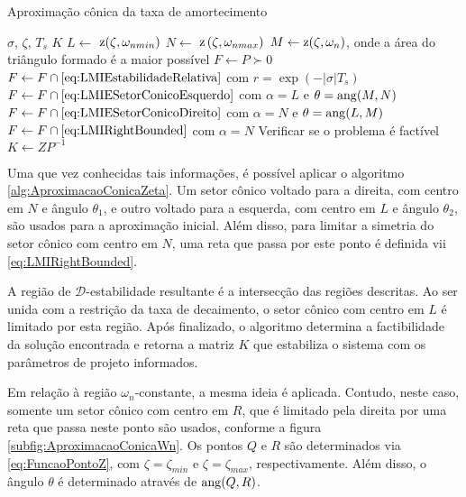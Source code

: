 \begin{algorithm}[ht!]
  \caption{Aproximação cônica da taxa de amortecimento}\label{alg:AproximacaoConicaZeta}
  \begin{algorithmic}[1]
    \Require $\sigma$, $\zeta$, $T_s$
    \Ensure $K$
    \State $L \gets $ $\operatorname{\mathrm{z}}(\zeta,\omega_{nmin})$
    \State $N \gets $ $\operatorname{\mathrm{z}}\left(\zeta,\omega_{nmax}\right)$
    \State $M \gets \operatorname{\mathrm{z}}(\zeta,\omega_n)$, onde a área do triângulo formado é a maior possível
    \State $F \gets P \succ 0$
    \State $F \gets F \cap \eqref{eq:LMIEstabilidadeRelativa}$ com $r = \exp{\left(-|\sigma|T_s\right)}$ 
    \State $F \gets F \cap \eqref{eq:LMIESetorConicoEsquerdo}$ com $\alpha = L$ e $\theta = \operatorname{ang}(M,N)$ 
    \State $F \gets F \cap \eqref{eq:LMIESetorConicoDireito}$ com $\alpha = N$ e $\theta = \operatorname{ang}(L,M)$ 
    \State $F \gets F \cap \eqref{eq:LMIRightBounded}$ com $\alpha = N$  
    \State Verificar se o problema é factível
    \State $K \gets ZP^{-1}$
  \end{algorithmic}
\end{algorithm}

Uma que vez conhecidas tais informações, é possível aplicar o algoritmo \ref{alg:AproximacaoConicaZeta}. Um setor cônico voltado para a direita, com centro em $N$ e ângulo $\theta_1$, e outro voltado para a esquerda, com centro em $L$ e ângulo $\theta_2$, são usados para a aproximação inicial. Além disso, para limitar a simetria do setor cônico com centro em $N$, uma reta que passa por este ponto é definida vii \eqref{eq:LMIRightBounded}.

A região de $\mathscr{D}$-estabilidade resultante é a intersecção das regiões descritas. Ao ser unida com a restrição da taxa de decaimento, o setor cônico com centro em $L$ é limitado por esta região. Após finalizado, o algoritmo determina a factibilidade da solução encontrada e retorna a matriz $K$ que estabiliza o sistema com os parâmetros de projeto informados.

Em relação à região $\omega_n$-constante, a mesma ideia é aplicada\cite{CHIQUETO2021}. Contudo, neste caso, somente um setor cônico com centro em $R$, que é limitado pela direita por uma reta que passa neste ponto são usados, conforme a figura \ref{subfig:AproximacaoConicaWn}. Os pontos $Q$ e $R$ são determinados via \eqref{eq:FuncaoPontoZ}, com $\zeta = \zeta_{min}$ e $\zeta = \zeta_{max}$, respectivamente. Além disso, o ângulo $\theta$ é determinado através de $\operatorname{ang}(Q,R)$.  

